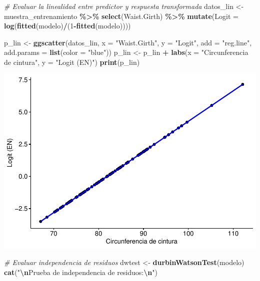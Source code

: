 \documentclass[
]{article}
\newenvironment{Shaded}{\begin{snugshade}}{\end{snugshade}}
\newcommand{\AttributeTok}[1]{\textcolor[rgb]{0.13,0.29,0.53}{#1}}
\newcommand{\CommentTok}[1]{\textcolor[rgb]{0.56,0.35,0.01}{\textit{#1}}}
\newcommand{\DecValTok}[1]{\textcolor[rgb]{0.00,0.00,0.81}{#1}}
\newcommand{\FunctionTok}[1]{\textcolor[rgb]{0.13,0.29,0.53}{\textbf{#1}}}
\newcommand{\NormalTok}[1]{#1}
\newcommand{\OtherTok}[1]{\textcolor[rgb]{0.56,0.35,0.01}{#1}}
\newcommand{\SpecialCharTok}[1]{\textcolor[rgb]{0.81,0.36,0.00}{\textbf{#1}}}
\newcommand{\StringTok}[1]{\textcolor[rgb]{0.31,0.60,0.02}{#1}}
\begin{document}
\begin{Shaded}
\begin{Highlighting}[]
\CommentTok{\# Evaluar la linealidad entre predictor y respuesta transformada}
\NormalTok{datos\_lin }\OtherTok{\textless{}{-}}\NormalTok{ muestra\_entrenamiento }\SpecialCharTok{\%\textgreater{}\%}
    \FunctionTok{select}\NormalTok{(Waist.Girth) }\SpecialCharTok{\%\textgreater{}\%}
    \FunctionTok{mutate}\NormalTok{(}\AttributeTok{Logit =} \FunctionTok{log}\NormalTok{(}\FunctionTok{fitted}\NormalTok{(modelo)}\SpecialCharTok{/}\NormalTok{(}\DecValTok{1}\SpecialCharTok{{-}}\FunctionTok{fitted}\NormalTok{(modelo))))}

\NormalTok{p\_lin }\OtherTok{\textless{}{-}} \FunctionTok{ggscatter}\NormalTok{(datos\_lin, }\AttributeTok{x =} \StringTok{"Waist.Girth"}\NormalTok{, }\AttributeTok{y =} \StringTok{"Logit"}\NormalTok{,}
                   \AttributeTok{add =} \StringTok{"reg.line"}\NormalTok{, }\AttributeTok{add.params =} \FunctionTok{list}\NormalTok{(}\AttributeTok{color =} \StringTok{"blue"}\NormalTok{))}
\NormalTok{p\_lin }\OtherTok{\textless{}{-}}\NormalTok{ p\_lin }\SpecialCharTok{+} \FunctionTok{labs}\NormalTok{(}\AttributeTok{x =} \StringTok{"Circunferencia de cintura"}\NormalTok{, }
                      \AttributeTok{y =} \StringTok{"Logit (EN)"}\NormalTok{)}
\FunctionTok{print}\NormalTok{(p\_lin)}
\end{Highlighting}
\end{Shaded}

\includegraphics{ep10_files/figure-latex/unnamed-chunk-5-3.pdf}

\begin{Shaded}
\begin{Highlighting}[]
\CommentTok{\# Evaluar independencia de residuos}
\NormalTok{dwtest }\OtherTok{\textless{}{-}} \FunctionTok{durbinWatsonTest}\NormalTok{(modelo)}
\FunctionTok{cat}\NormalTok{(}\StringTok{"}\SpecialCharTok{\textbackslash{}n}\StringTok{Prueba de independencia de residuos:}\SpecialCharTok{\textbackslash{}n}\StringTok{"}\NormalTok{)}
\end{Highlighting}
\end{Shaded}
\end{document}
